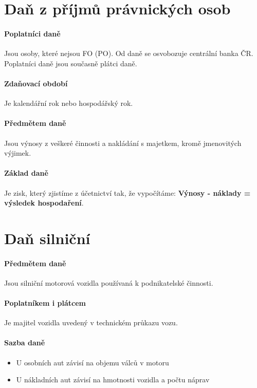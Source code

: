 \section*{Daň z příjmů právnických osob}

\paragraph{Poplatníci daně}
Jsou osoby, které nejsou FO (PO). Od daně se osvobozuje centrální banka ČR. Poplatníci daně jsou současně plátci daně.

\paragraph{Zdaňovací období}
Je kalendářní rok nebo hospodářský rok.

\paragraph{Předmětem daně}
Jsou výnosy z veškeré činnosti a nakládání s majetkem, kromě jmenovitých výjimek.

\paragraph{Základ daně}
Je zisk, který zjistíme z účetnictví tak, že vypočítáme: \textbf{Výnosy - náklady = výsledek hospodaření}.

\section*{Daň silniční}

\paragraph{Předmětem daně}
Jsou silniční motorová vozidla používaná k podnikatelské činnosti.

\paragraph{Poplatníkem i plátcem}
Je majitel vozidla uvedený v technickém průkazu vozu.

\paragraph{Sazba daně}
\begin{itemize}
    \item U osobních aut závisí na objemu válců v motoru
    \item U nákladních aut závisí na hmotnosti vozidla a počtu náprav
\end{itemize}

